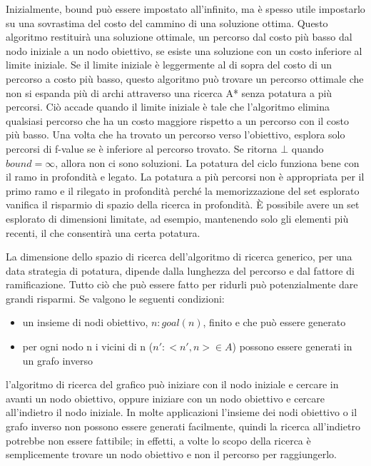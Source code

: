 \documentclass[a4paper]{extarticle}
\begin{document}
Inizialmente, bound può essere impostato all'infinito, ma è spesso utile impostarlo su una sovrastima del costo del cammino di una soluzione ottima. Questo algoritmo restituirà una soluzione ottimale, un percorso dal costo più basso dal nodo iniziale a un nodo obiettivo, se esiste una soluzione con un costo inferiore al limite iniziale. Se il limite iniziale è leggermente al di sopra del costo di un percorso a costo più basso, questo algoritmo può trovare un percorso ottimale che non si espanda più di archi attraverso una ricerca A* senza potatura a più percorsi. Ciò accade quando il limite iniziale è tale che l'algoritmo elimina qualsiasi percorso che ha un costo maggiore rispetto a un percorso con il costo più basso. Una volta che ha trovato un percorso verso l'obiettivo, esplora solo percorsi di f-value se è inferiore al percorso trovato. Se ritorna $ \bot$ quando $bound= \infty $, allora non ci sono soluzioni. La potatura del ciclo funziona bene con il ramo in profondità e legato. La potatura a più percorsi non è appropriata per il primo ramo e il rilegato in profondità perché la memorizzazione del set esplorato vanifica il risparmio di spazio della ricerca in profondità. È possibile avere un set esplorato di dimensioni limitate, ad esempio, mantenendo solo gli elementi più recenti, il che consentirà una certa potatura.

La dimensione dello spazio di ricerca dell'algoritmo di ricerca generico, per una data strategia di potatura, dipende dalla lunghezza del percorso e dal fattore di ramificazione. Tutto ciò che può essere fatto per ridurli può potenzialmente dare grandi risparmi. Se valgono le seguenti condizioni:

\begin{itemize}
\item un insieme di nodi obiettivo, ${ n: goal(n)}$, finito e che può essere generato
\item per ogni nodo n i vicini di n (${n': <n',n>\in A}$) possono essere generati in un grafo inverso
\end{itemize}
l'algoritmo di ricerca del grafico può iniziare con il nodo iniziale e cercare in avanti un nodo obiettivo, oppure iniziare con un nodo obiettivo e cercare all'indietro il nodo iniziale. In molte applicazioni l'insieme dei nodi obiettivo o il grafo inverso non possono essere generati facilmente, quindi la ricerca all'indietro potrebbe non essere fattibile; in effetti, a volte lo scopo della ricerca è semplicemente trovare un nodo obiettivo e non il percorso per raggiungerlo.
\end{document}
